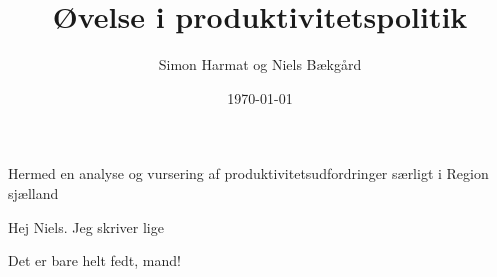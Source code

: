 \documentclass[a4paper, 12pt]{article}
\author{Simon Harmat og Niels Bækgård}
\title{Øvelse i produktivitetspolitik}
\date{\today}
\begin{document}
Hermed en analyse og vursering af produktivitetsudfordringer særligt i Region sjælland

Hej Niels. Jeg skriver lige 

Det er bare helt fedt, mand!
\end{document}
